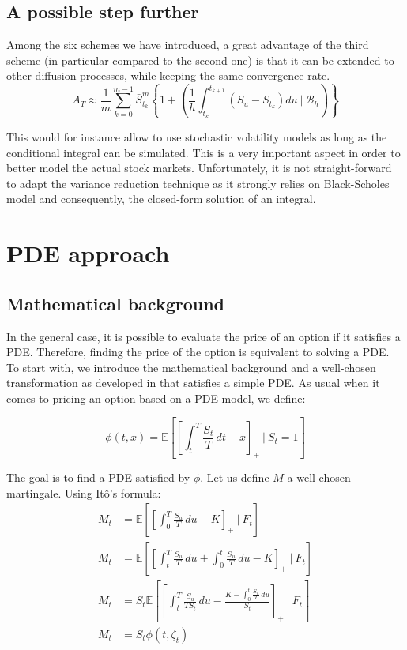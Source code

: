 \documentclass{article}
\begin{document}
\subsection{A possible step further}

Among the six schemes we have introduced, a great advantage of the third scheme (in particular compared to the
second one) is that it can be extended to other diffusion processes, while keeping the same convergence rate.
\begin{equation}
    A_T \approx \frac{1}{m} \sum_{k=0}^{m-1}
    	\bar S_{t_k}^m \left\{ 1 +
		\left( \frac{1}{h} \int_{t_k}^{t_{k+1}} \left( S_u - S_{t_k} \right) du \ \Big\vert \ \mathcal B_h \right) \right\} \tag{3+}
\end{equation}

This would for instance allow to use stochastic volatility models as long as the conditional integral can be simulated.
This is a very important aspect in order to better model the actual stock markets.
Unfortunately, it is not straight-forward to adapt the variance reduction technique as it strongly relies on
Black-Scholes model and consequently, the closed-form solution of an integral.

\section{PDE approach}

\subsection{Mathematical background}

In the general case, it is possible to evaluate the price of an option if it satisfies a PDE.
Therefore, finding the price of the option is equivalent to solving a PDE.
To start with, we introduce the mathematical background and a well-chosen transformation as developed 
in \cite{Rogers} that satisfies a simple PDE.
As usual when it comes to pricing an option based on a PDE model, we define:

\begin{equation}
	\phi(t,x) = \mathbb E \left[ \left[ \int_{t}^{T} \frac{S_{t}}{T}\,dt-x \right]_{+} \ \big\vert \ S_{t}=1 \right]
	\tag{I}
\end{equation}

The goal is to find a PDE satisfied by $\phi$. Let us define $M$ a well-chosen martingale.
Using It\^o's formula:
\begin{align*}
        M_{t} &= \mathbb E \left[ \left[ \int_{0}^{T} \frac{S_{u}}{T}\,du-K \right]_{+} \ \Big\vert \ F_{t} \right] \\
        M_{t} &= \mathbb E \left[ \left[ \int_{t}^{T} \frac{S_{u}}{T}\,du+\int_{0}^{t} \frac{S_{u}}{T}\,du-K \right]_{+}
        	 \ \Big\vert \ F_{t} \right]  \\
        M_{t} &= S_{t} \mathbb E \left[ \left[ \int_{t}^{T} \frac{S_{u}}
        {TS_{t}}\,du -\frac{K-\int_{0}^{t} \frac{S_{u}}{T}\,du}{S_{t}} \right]_{+} \ \Big\vert \ F_{t} \right] \\
        M_{t} &= S_{t}\phi(t,\zeta_{t})
\end{align*}
\end{document}
